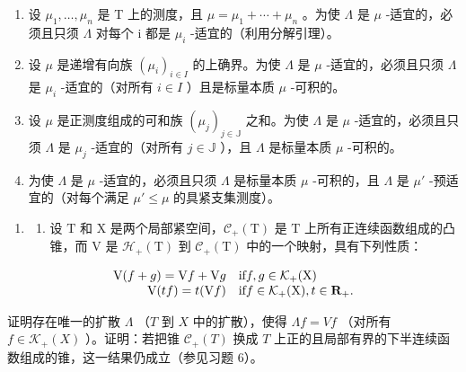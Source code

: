 \begin{enumerate}
\def\labelenumi{\alph{enumi})}
\item
  设 \(\mu_{1},\ldots,\mu_{n}\) 是 T 上的测度，且 \(\mu=\mu_{1}+\cdots+\mu_{n}\) 。为使 \(\Lambda\) 是 \(\mu\) -适宜的，必须且只须 \(\Lambda\) 对每个 i 都是 \(\mu_{i}\) -适宜的（利用分解引理）。
\item
  设 \(\mu\) 是递增有向族 \((\mu_i)_{i \in I}\) 的上确界。为使 \(\Lambda\) 是 \(\mu\) -适宜的，必须且只须 \(\Lambda\) 是 \(\mu_i\) -适宜的（对所有 \(i \in I\) ）且是标量本质 \(\mu\) -可积的。
\item
  设 \(\mu\) 是正测度组成的可和族 \((\mu_j)_{j \in \mathbb{J}}\) 之和。为使 \(\Lambda\) 是 \(\mu\) -适宜的，必须且只须 \(\Lambda\) 是 \(\mu_j\) -适宜的（对所有 \(j \in \mathbb{J}\) ），且 \(\Lambda\) 是标量本质 \(\mu\) -可积的。
\item
  为使 \(\Lambda\) 是 \(\mu\) -适宜的，必须且只须 \(\Lambda\) 是标量本质 \(\mu\) -可积的，且 \(\Lambda\) 是 \(\mu'\) -预适宜的（对每个满足 \(\mu' \leqslant \mu\) 的具紧支集测度）。
\end{enumerate}

\begin{enumerate}
\def\labelenumi{\arabic{enumi})}
\setcounter{enumi}{8}
\tightlist
\item
  \begin{enumerate}
  \def\labelenumii{\alph{enumii})}
  \tightlist
  \item
    设 \(\mathrm{T}\) 和 \(\mathrm{X}\) 是两个局部紧空间，\(\mathcal{C}_{+}(\mathrm{T})\) 是 \(\mathrm{T}\) 上所有正连续函数组成的凸锥，而 \(\mathrm{V}\) 是 \(\mathcal{H}_{+}(\mathrm{T})\) 到 \(\mathcal{C}_{+}(\mathrm{T})\) 中的一个映射，具有下列性质：
  \end{enumerate}
\end{enumerate}

\[
\begin{array}{r l} \mathrm{V} (f + g) = \mathrm{V} f + \mathrm{V} g & \text {if} f, g \in \mathcal {K} _ {+} (\mathrm{X}) \\ \mathrm{V} (t f) = t (\mathrm{V} f) & \text {if} f \in \mathcal {K} _ {+} (\mathrm{X}), t \in \mathbf {R} _ {+}. \end{array}
\]

证明存在唯一的扩散 \(\Lambda\) （\(T\) 到 \(X\) 中的扩散），使得 \(\Lambda f = Vf\) （对所有 \(f \in \mathcal{K}_{+}(X)\) ）。证明：若把锥 \(\mathcal{C}_{+}(T)\) 换成 \(T\) 上正的且局部有界的下半连续函数组成的锥，这一结果仍成立（参见习题 6）。

